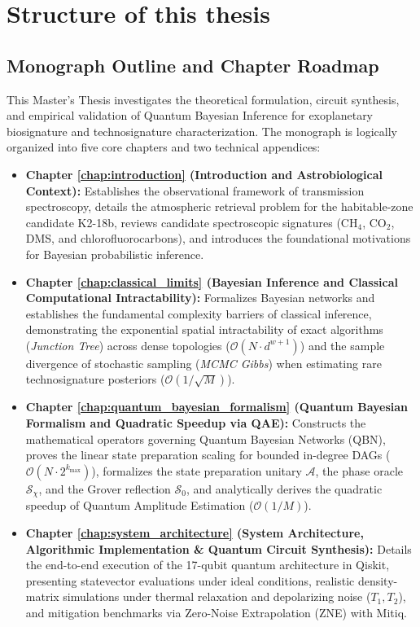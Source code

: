 \chapter*{Structure of this thesis}

\section*{Monograph Outline and Chapter Roadmap}
This Master's Thesis investigates the theoretical formulation, circuit synthesis, and empirical validation of Quantum Bayesian Inference for exoplanetary biosignature and technosignature characterization. The monograph is logically organized into five core chapters and two technical appendices:

\begin{itemize}
    \item \textbf{Chapter \ref{chap:introduction} (Introduction and Astrobiological Context):} Establishes the observational framework of transmission spectroscopy, details the atmospheric retrieval problem for the habitable-zone candidate K2-18b, reviews candidate spectroscopic signatures ($\mathrm{CH}_4$, $\mathrm{CO}_2$, DMS, and chlorofluorocarbons), and introduces the foundational motivations for Bayesian probabilistic inference.
    \item \textbf{Chapter \ref{chap:classical_limits} (Bayesian Inference and Classical Computational Intractability):} Formalizes Bayesian networks and establishes the fundamental complexity barriers of classical inference, demonstrating the exponential spatial intractability of exact algorithms (\textit{Junction Tree}) across dense topologies ($\mathcal{O}(N \cdot d^{w+1})$) and the sample divergence of stochastic sampling (\textit{MCMC Gibbs}) when estimating rare technosignature posteriors ($\mathcal{O}(1/\sqrt{M})$).
    \item \textbf{Chapter \ref{chap:quantum_bayesian_formalism} (Quantum Bayesian Formalism and Quadratic Speedup via QAE):} Constructs the mathematical operators governing Quantum Bayesian Networks (QBN), proves the linear state preparation scaling for bounded in-degree DAGs ($\mathcal{O}(N \cdot 2^{k_{\max}})$), formalizes the state preparation unitary $\mathcal{A}$, the phase oracle $\mathcal{S}_\chi$, and the Grover reflection $\mathcal{S}_0$, and analytically derives the quadratic speedup of Quantum Amplitude Estimation ($\mathcal{O}(1/M)$).
    \item \textbf{Chapter \ref{chap:system_architecture} (System Architecture, Algorithmic Implementation \& Quantum Circuit Synthesis):} Details the end-to-end execution of the 17-qubit quantum architecture in Qiskit, presenting statevector evaluations under ideal conditions, realistic density-matrix simulations under thermal relaxation and depolarizing noise ($T_1, T_2$), and mitigation benchmarks via Zero-Noise Extrapolation (ZNE) with Mitiq.

\end{itemize}
